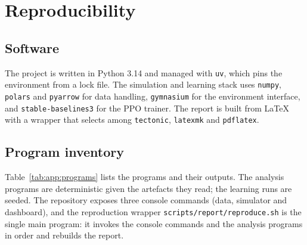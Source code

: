 \section{Reproducibility}
\label{app:repro}

\subsection{Software}

The project is written in Python 3.14 and managed with \texttt{uv}, which pins
the environment from a lock file. The simulation and learning stack uses
\texttt{numpy}, \texttt{polars} and \texttt{pyarrow} for data handling,
\texttt{gymnasium} for the environment interface\cite{towers2024gymnasium},
and \texttt{stable-baselines3} for the PPO trainer\cite{raffin2021stablebaselines3}.
The report is built from LaTeX with a wrapper that selects among
\texttt{tectonic}, \texttt{latexmk} and \texttt{pdflatex}.

\subsection{Program inventory}

Table~\ref{tab:app:programs} lists the programs and their outputs. The
analysis programs are deterministic given the artefacts they read; the
learning runs are seeded. The repository exposes three console commands (data,
simulator and dashboard), and the reproduction wrapper
\texttt{scripts/report/reproduce.sh} is the single main program: it invokes
the console commands and the analysis programs in order and rebuilds the
report.

